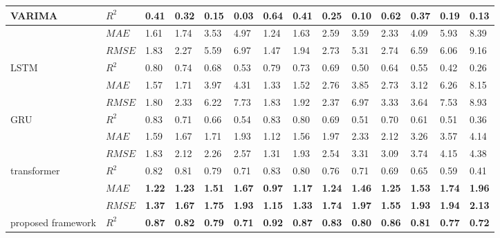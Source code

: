 \begin{table}[htbp]
{\begin{tabular}{llllllllllllll}
  VARIMA & $R^{2}$ & 0.41 & 0.32 & 0.15 & 0.03 & 0.64 & 0.41 & 0.25 & 0.10 & 0.62 & 0.37 & 0.19 & 0.13\\
  \hline
  ~ & $MAE$ & 1.61 & 1.74 & 3.53 & 4.97 & 1.24 & 1.63 & 2.59 & 3.59 & 2.33 & 4.09 & 5.93 & 8.39\\
  ~ & $RMSE$ & 1.83 & 2.27 & 5.59 & 6.97 & 1.47 & 1.94 & 2.73 & 5.31 & 2.74 & 6.59 & 6.06 & 9.16\\
  LSTM &  $R^{2}$ & 0.80 & 0.74 & 0.68 & 0.53 & 0.79 & 0.73 & 0.69 & 0.50 & 0.64 & 0.55 & 0.42 & 0.26\\
  \hline
  ~ & $MAE$ & 1.57 & 1.71 & 3.97 & 4.31 & 1.33 & 1.52 & 2.76 & 3.85 & 2.73 & 3.12 & 6.26 & 8.15\\
  ~ & $RMSE$ & 1.80 & 2.33 & 6.22 & 7.73 & 1.83 & 1.92 & 2.37 & 6.97 & 3.33 & 3.64 & 7.53 & 8.93\\
  GRU &  $R^{2}$ & 0.83 & 0.71 & 0.66 & 0.54 & 0.83 & 0.80 & 0.69 & 0.51 & 0.70 & 0.61 & 0.51 & 0.36\\
  \hline
  ~ & $MAE$ & 1.59 & 1.67 & 1.71 & 1.93 & 1.12 & 1.56 & 1.97 & 2.33 & 2.12 & 3.26 & 3.57 & 4.14\\
  ~ & $RMSE$ & 1.83 & 2.12 & 2.26 & 2.57 & 1.31 & 1.93 & 2.54 & 3.31 & 3.09 & 3.74 & 4.15 & 4.38\\
  transformer & $R^{2}$ & 0.82 & 0.81 & 0.79 & 0.71 & 0.83 & 0.80 & 0.76 & 0.71 & 0.69 & 0.65 & 0.59 & 0.41\\
  \hline
  ~ & $MAE$ & \textbf{1.22} & \textbf{1.23} & \textbf{1.51}& \textbf{1.67} & \textbf{0.97} & \textbf{1.17} & \textbf{1.24}& \textbf{1.46} & \textbf{1.25} & \textbf{1.53} & \textbf{1.74}& \textbf{1.96}\\
  ~ & $RMSE$ & \textbf{1.37} & \textbf{1.67} & \textbf{1.75}& \textbf{1.93} & \textbf{1.15} & \textbf{1.33} & \textbf{1.74}& \textbf{1.97} & \textbf{1.55} & \textbf{1.93} & \textbf{1.94}& \textbf{2.13}\\
  proposed framework & $R^{2}$& \textbf{0.87} & \textbf{0.82} & \textbf{0.79}& \textbf{0.71} & \textbf{0.92} & \textbf{0.87} & \textbf{0.83}& \textbf{0.80} & \textbf{0.86} & \textbf{0.81} & \textbf{0.77}& \textbf{0.72}\\
  \hline
\end{tabular}}
\end{table}

